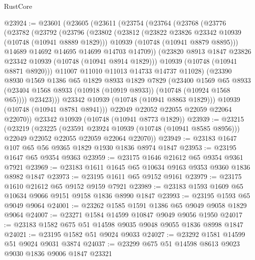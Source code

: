 \begin{lexlean}{RustCore}
\begin{coremodule}
@23924 := @23601
    (@23605
      (@23611
        (@23754
          (@23764
            (@23768
              (@23776
                (@23782
                  (@23792
                    (@23796
                      (@23802
                        (@23812
                          (@23822 @23826 @23342 @10939 (@10748 (@10941 @8889 @1829)))
                          @10939
                          (@10748 (@10941 @8879 @8895)))
                        @14689
                        @14692
                        @14695
                        @14699
                        @14703
                        @14709))
                    (@23820 @8913 @1847 @23826 @23342 @10939 (@10748 (@10941 @8914 @1829)))
                    @10939
                    (@10748 (@10941 @8871 @8920)))
                  @11007
                  @11010
                  @11013
                  @14733
                  @14737
                  @11028)
                (@23390
                  @8930
                  @1569
                  @1386
                  @65
                  @1829
                  @8933
                  @1829
                  @7829
                  (@23400
                    @1569
                    @65
                    @8933
                    (@23404 @1568 @8933 (@10918 (@10919 @8933)) (@10748 (@10924 @1568 @65))))
                  @23423)))
            @23342
            @10939
            (@10748 (@10941 @8863 @1829)))
          @10939
          (@10748 (@10941 @8781 @8941)))
        @22049
        @22052
        @22055
        @22059
        @22064
        @22070))
    @23342
    @10939
    (@10748 (@10941 @8773 @1829))
@23939 := @23215
    (@23219
      (@23225
        (@23591 @23924 @10939 (@10748 (@10941 @8585 @8956)))
        @22049
        @22052
        @22055
        @22059
        @22064
        @22070))
@23949 := @23183 @1647 @107 @65 @56 @9365 @1829 @1930 @1836 @8974 @1847
@23953 := @23195 @1647 @65 @9354 @9363
@23959 := @23175 @1646 @21612 @65 @9354 @9361 @7921
@23969 := @23183 @1611 @1645 @65 @10634 @9163 @9353 @9360 @1836 @8982 @1847
@23973 := @23195 @1611 @65 @9152 @9161
@23979 := @23175 @1610 @21612 @65 @9152 @9159 @7921
@23989 := @23183 @1593 @1609 @65 @10634 @9066 @9151 @9158 @1836 @8990 @1847
@23993 := @23195 @1593 @65 @9049 @9064
@24001 := @23262 @1585 @1591 @1386 @65 @9049 @9058 @1829 @9064
@24007 := @23271 @1584 @14599 @10847 @9049 @9056 @1950
@24017 := @23183 @1582 @675 @51 @14598 @9035 @9048 @9055 @1836 @8998 @1847
@24021 := @23195 @1582 @51 @9024 @9033
@24027 := @23292 @1581 @14599 @51 @9024 @9031 @3874
@24037 := @23299 @675 @51 @14598 @8613 @9023 @9030 @1836 @9006 @1847 @23321

\end{coremodule}
\end{lexlean}
